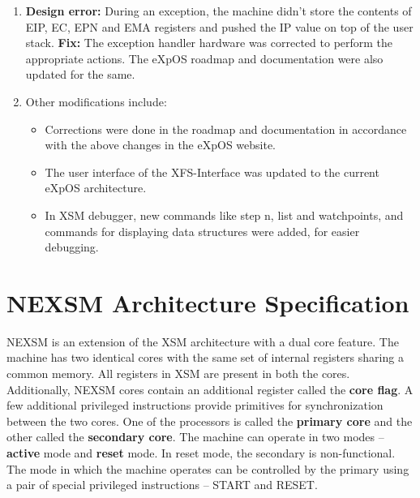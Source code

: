 \documentclass[12pt]{report}
\begin{document}
\begin{enumerate}
    \item
    \textbf{Design error:} During an exception, the machine didn't store the contents of EIP, EC, EPN and EMA registers and pushed the IP value on top of the user stack.
    \newline
    \textbf{Fix:} The exception handler hardware was corrected to perform the appropriate actions. The eXpOS roadmap and documentation were also updated for the same.

    \item Other modifications include:
    \begin{itemize}
        \item Corrections were done in the roadmap and documentation in accordance with the above changes in the eXpOS website.
        \item The user interface of the XFS-Interface was updated to the current eXpOS architecture.
        \item In XSM debugger, new commands like step n, list and watchpoints, and commands for displaying data structures were added, for easier debugging.
    \end{itemize}
\end{enumerate}

\section{NEXSM Architecture Specification}
NEXSM is an extension of the XSM architecture with a dual core feature. The machine has two identical cores with the same set of internal registers sharing a common memory. All registers in XSM are present in both the cores. Additionally, NEXSM cores contain an additional register called the \textbf{core flag}. A few additional privileged instructions provide primitives for synchronization between the two cores. One of the processors is called the \textbf{primary core} and the other called the \textbf{secondary core}. The machine can operate in two modes -- \textbf{active} mode and \textbf{reset} mode. In reset mode, the secondary is non-functional. The mode in which the machine operates can be controlled by the primary using a pair of special privileged instructions -- START and RESET.
\end{document}
